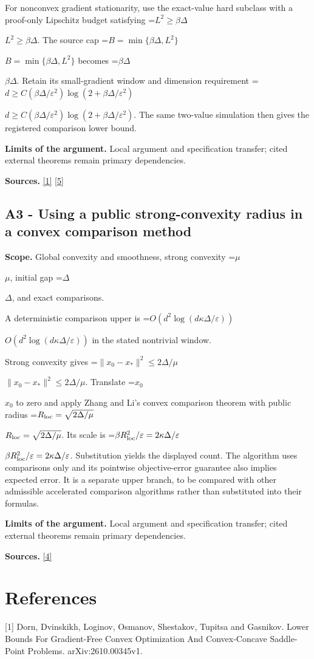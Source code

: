 \documentclass[10pt,a4paper]{article}
\newcommand{\AtlasMath}[1]{\par\begingroup\centering\setbox0=\hbox{$\displaystyle #1$}\ifdim\wd0>1.4\linewidth\typeout{ATLAS WIDE FORMULA: \the\wd0}\fi\ifdim\wd0>\linewidth\resizebox{\linewidth}{!}{\box0}\else\box0\fi\par\endgroup}
\newcommand{\AtlasInlineMath}[1]{\begingroup\setbox0=\hbox{$#1$}\ifdim\wd0>.4\linewidth\endgroup\AtlasMath{#1}\else\endgroup$#1$\fi}
\begin{document}
For nonconvex gradient stationarity, use the exact-value hard subclass with a proof-only Lipschitz budget satisfying \AtlasInlineMath{L^2\ge\beta\Delta}. The source cap \AtlasInlineMath{B=\min\{\beta\Delta,L^2\}} becomes \AtlasInlineMath{\beta\Delta}. Retain its small-gradient window and dimension requirement \AtlasInlineMath{d\ge C(\beta\Delta/\varepsilon^2)\log(2+\beta\Delta/\varepsilon^2)}. The same two-value simulation then gives the registered comparison lower bound.

\textbf{Limits of the argument.} Local argument and specification transfer; cited external theorems remain primary dependencies.

\textbf{Sources.} \href{https://arxiv.org/html/2610.00345v1}{[1]} \href{https://arxiv.org/html/2610.19652v1}{[5]}

\subsection{A3 - Using a public strong-convexity radius in a convex comparison method}
\textbf{Scope.} Global convexity and smoothness, strong convexity \AtlasInlineMath{\mu}, initial gap \AtlasInlineMath{\Delta}, and exact comparisons.

A deterministic comparison upper is \AtlasInlineMath{O(d^2\log(d\kappa\Delta/\varepsilon))} in the stated nontrivial window.

Strong convexity gives \AtlasInlineMath{\|x_0-x_*\|^2\le2\Delta/\mu}. Translate \AtlasInlineMath{x_0} to zero and apply Zhang and Li's convex comparison theorem with public radius \AtlasInlineMath{R_{\rm loc}=\sqrt{2\Delta/\mu}}. Its scale is \AtlasInlineMath{\beta R_{\rm loc}^2/\varepsilon=2\kappa\Delta/\varepsilon}. Substitution yields the displayed count. The algorithm uses comparisons only and its pointwise objective-error guarantee also implies expected error. It is a separate upper branch, to be compared with other admissible accelerated comparison algorithms rather than substituted into their formulas.

\textbf{Limits of the argument.} Local argument and specification transfer; cited external theorems remain primary dependencies.

\textbf{Sources.} \href{https://arxiv.org/html/2405.11454v1}{[4]}

\section{References}
[1] Dorn, Dvinskikh, Loginov, Osmanov, Shestakov, Tupitsa and Gasnikov. Lower Bounds For Gradient-Free Convex Optimization And Convex-Concave Saddle-Point Problems. arXiv:2610.00345v1.
\end{document}
